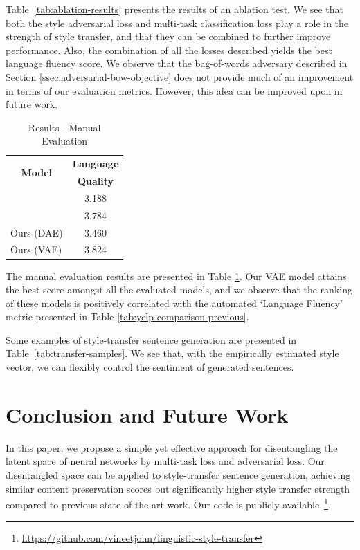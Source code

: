 \documentclass[11pt,a4paper]{article}
\newcommand{\tabh}[1]{\multicolumn{1}{c|}{\textbf{#1}}}
\newcommand{\tabc}[2]{\multicolumn{1}{|c|}{\multirow{#1}{*}{\textbf{#2}}}}
\begin{document}
Table~\ref{tab:ablation-results} presents the results of an ablation test. We see that both the style adversarial loss and multi-task classification loss play a role in the strength of style transfer, and that they can be combined to further improve performance. Also, the combination of all the losses described yields the best language fluency score. We observe that the bag-of-words adversary described in Section \ref{ssec:adversarial-bow-objective} does not provide much of an improvement in terms of our evaluation metrics. However, this idea can be improved upon in future work.

\begin{table}[ht]
	\centering
	\begin{tabular}{| l | c |}
		\hline
		\tabc{2}{Model}       & \tabh{Language} \\
		                      & \tabh{Quality}  \\
		\hline
		\hline
		\citet{shen2017style} & 3.188           \\
		\hline
		\citet{fu2017style}   & 3.784           \\
		\hline
		Ours (DAE)            & 3.460           \\
		\hline
		Ours (VAE)            & 3.824           \\
		\hline
	\end{tabular}
	\caption{Results - Manual Evaluation}
	\label{tab:manual-evaluation}
\end{table}

The manual evaluation results are presented in Table \ref{tab:manual-evaluation}. Our VAE model attains the best score amongst all the evaluated models, and we observe that the ranking of these models is positively correlated with the automated `Language Fluency' metric presented in Table \ref{tab:yelp-comparison-previous}.

Some examples of style-transfer sentence generation are presented in Table~\ref{tab:transfer-samples}. We see that, with the empirically estimated style vector, we can flexibly control the sentiment of generated sentences.


\section{Conclusion and Future Work}
In this paper, we propose a simple yet effective approach for disentangling the latent space of neural networks by multi-task loss and adversarial loss. Our disentangled space can be applied to style-transfer sentence generation, achieving similar content preservation scores but significantly higher style transfer strength compared to previous state-of-the-art work. Our code is publicly available~\footnote{\url{https://github.com/vineetjohn/linguistic-style-transfer}}.
\end{document}
